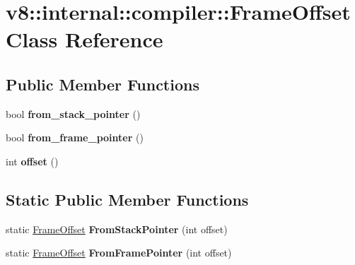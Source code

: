 \hypertarget{classv8_1_1internal_1_1compiler_1_1_frame_offset}{}\section{v8\+:\+:internal\+:\+:compiler\+:\+:Frame\+Offset Class Reference}
\label{classv8_1_1internal_1_1compiler_1_1_frame_offset}
\subsection*{Public Member Functions}
\begin{DoxyCompactItemize}
\item 
bool {\bfseries from\+\_\+stack\+\_\+pointer} ()\hypertarget{classv8_1_1internal_1_1compiler_1_1_frame_offset_ada9d69255b15ecc8239260a430fd91f8}{}\label{classv8_1_1internal_1_1compiler_1_1_frame_offset_ada9d69255b15ecc8239260a430fd91f8}

\item 
bool {\bfseries from\+\_\+frame\+\_\+pointer} ()\hypertarget{classv8_1_1internal_1_1compiler_1_1_frame_offset_a4e2d1417aae4d286e68596b8d6e36210}{}\label{classv8_1_1internal_1_1compiler_1_1_frame_offset_a4e2d1417aae4d286e68596b8d6e36210}

\item 
int {\bfseries offset} ()\hypertarget{classv8_1_1internal_1_1compiler_1_1_frame_offset_a1a77b35047bbacae6e6e3f118d6ec8ef}{}\label{classv8_1_1internal_1_1compiler_1_1_frame_offset_a1a77b35047bbacae6e6e3f118d6ec8ef}

\end{DoxyCompactItemize}
\subsection*{Static Public Member Functions}
\begin{DoxyCompactItemize}
\item 
static \hyperlink{classv8_1_1internal_1_1compiler_1_1_frame_offset}{Frame\+Offset} {\bfseries From\+Stack\+Pointer} (int offset)\hypertarget{classv8_1_1internal_1_1compiler_1_1_frame_offset_a39ceedec210cbac1511d9545490ef4f5}{}\label{classv8_1_1internal_1_1compiler_1_1_frame_offset_a39ceedec210cbac1511d9545490ef4f5}

\item 
static \hyperlink{classv8_1_1internal_1_1compiler_1_1_frame_offset}{Frame\+Offset} {\bfseries From\+Frame\+Pointer} (int offset)\hypertarget{classv8_1_1internal_1_1compiler_1_1_frame_offset_a0743a84cbb8fd4dc066ddd3f357b48fa}{}\label{classv8_1_1internal_1_1compiler_1_1_frame_offset_a0743a84cbb8fd4dc066ddd3f357b48fa}

\end{DoxyCompactItemize}

